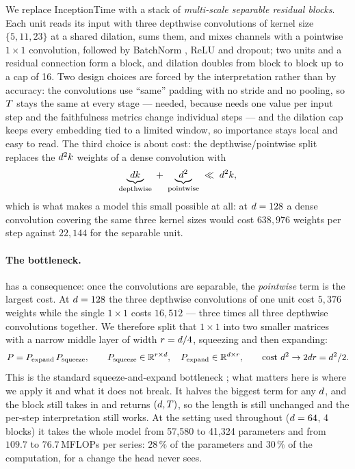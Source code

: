 We replace InceptionTime with a stack of \emph{multi-scale separable residual blocks}. Each unit
reads its input with three depthwise convolutions of kernel size $\{5, 11, 23\}$ at a shared
dilation, sums them, and mixes channels with a pointwise $1\times1$ convolution, followed by
BatchNorm \citep{ioffe2015batchnorm}, ReLU and dropout; two units and a residual connection form a
block, and dilation doubles from block to block up to a cap of 16. Two design choices are forced by
the interpretation rather than by accuracy: the convolutions use ``same'' padding with no stride and
no pooling, so $T$ stays the same at every stage --- needed, because  needs
one value per input step and the faithfulness metrics change individual steps --- and the dilation cap
keeps every embedding tied to a limited window, so importance stays local and easy to read. The third
choice is about cost: the depthwise/pointwise split \citep{chollet2017xception, howard2017mobilenets}
replaces the $d^2 k$ weights of a dense convolution with
\begin{equation}
  \underbrace{d k}_{\text{depthwise}} \;+\; \underbrace{d^{2}}_{\text{pointwise}}
  \;\ll\; d^{2} k ,
  \label{eq:sep_cost}
\end{equation}
which is what makes a model this small possible at all: at $d = 128$ a dense convolution
covering the same three kernel sizes would cost $638{,}976$ weights per step against $22{,}144$ for
the separable unit.

\paragraph{The bottleneck.}
 has a consequence: once the convolutions are separable, the \emph{pointwise} term
is the largest cost. At $d = 128$ the three depthwise convolutions of one unit cost $5{,}376$
weights while the single $1\times1$ costs $16{,}512$ --- three times all three depthwise convolutions
together. We therefore split that $1\times1$ into two smaller matrices with a narrow middle layer of
width $r = d / 4$, squeezing and then expanding:
\begin{equation}
  P = P_{\mathrm{expand}}\, P_{\mathrm{squeeze}}, \qquad
  P_{\mathrm{squeeze}} \in \mathbb{R}^{r \times d}, \quad
  P_{\mathrm{expand}} \in \mathbb{R}^{d \times r},
  \qquad \text{cost } d^{2} \rightarrow 2d r = d^{2}/2 .
  \label{eq:bottleneck}
\end{equation}
This is the standard squeeze-and-expand bottleneck \citep{he2016resnet, iandola2016squeezenet,
sandler2018mobilenetv2}; what matters here is where we apply it and what it does not break. It halves
the biggest term for any $d$, and the block still takes in and returns $(d, T)$, so
the length is still unchanged and the per-step interpretation still works. At the setting used
throughout ($d = 64$, 4 blocks) it takes the whole model from 57{,}580 to 41{,}324 parameters
and from $109.7$ to $76.7$\,MFLOPs per series: $28\,\%$ of the parameters and $30\,\%$ of the
computation, for a change the head never sees.

